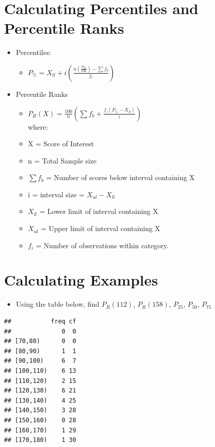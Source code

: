 \documentclass[12pt]{article}
\begin{document}
\section{Calculating Percentiles and Percentile
Ranks}\label{calculating-percentiles-and-percentile-ranks}

\begin{itemize}
\itemsep1pt\parskip0pt
\item
  Percentiles:

  \begin{itemize}
  \itemsep1pt\parskip0pt
  \item
    $ P_{\%} = X_{ll} + i
    \left(\frac{n(\frac{P_{R}}{100}) - \sum f_{b}}{f_{i}}\right) $
  \end{itemize}
\item
  Percentile Ranks

  \begin{itemize}
  \itemsep1pt\parskip0pt
  \item
    $ P_{R}(X) = \frac{100}{n}\left(\sum f_{b} +
    \frac{f_{i}(P_{\%} - X_{ll})}{i}\right)$  
    \\
 where:
  \item
    X = Score of Interest
  \item
    n = Total Sample size
  \item
    \(\sum f_{b}\) = Number of scores below interval containing X
  \item
    i = interval size = \(X_{ul} - X_{ll}\)
  \item
    \(X_{ll}\) = Lower limit of interval containing X
  \item
    \(X_{ul}\) = Upper limit of interval containing X
  \item 
     \(f_{i} \) = Number of observations within category.
  \end{itemize}
\end{itemize}

\section{Calculating Examples}\label{calculating-examples}

\begin{itemize}
\itemsep1pt\parskip0pt
\item
  Using the table below, find \(P_{R}(112)\), \(P_{R}(158)\),
  \(P_{25}\), \(P_{50}\), \(P_{75}\)
\end{itemize}

\begin{verbatim}
##           freq cf
##              0  0
## [70,80)      0  0
## [80,90)      1  1
## [90,100)     6  7
## [100,110)    6 13
## [110,120)    2 15
## [120,130)    6 21
## [130,140)    4 25
## [140,150)    3 28
## [150,160)    0 28
## [160,170)    1 29
## [170,180)    1 30
\end{verbatim}
\end{document}
